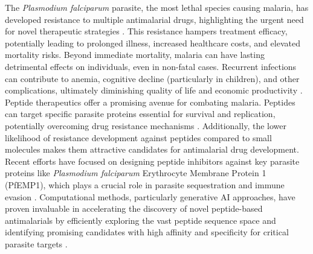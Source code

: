 The \textit{Plasmodium falciparum} parasite, the most lethal species causing malaria, has developed
resistance to multiple antimalarial drugs, highlighting the urgent need for novel therapeutic
strategies \cite{fairhurst2012artemisinin}. This resistance hampers treatment
efficacy, potentially leading to prolonged illness, increased healthcare costs, and elevated
mortality risks. Beyond immediate mortality, malaria can have lasting detrimental effects on
individuals, even in non-fatal cases. Recurrent infections can contribute to anemia, cognitive
decline (particularly in children), and other complications, ultimately diminishing quality of life
and economic productivity \cite{shukla2022super}.
\\

Peptide therapeutics offer a promising avenue for combating malaria. Peptides can target specific
parasite proteins essential for survival and replication, potentially overcoming drug resistance
mechanisms \cite{li2009pfemp1}. Additionally, the lower likelihood of resistance development against
peptides compared to small molecules makes them attractive candidates for antimalarial drug
development. Recent efforts have focused on designing peptide inhibitors against key parasite
proteins like \textit{Plasmodium falciparum} Erythrocyte Membrane Protein 1 (PfEMP1), which plays a
crucial role in parasite sequestration and immune evasion \cite{jensen2020pfemp1}. Computational methods, particularly
generative AI approaches, have proven invaluable in accelerating the discovery of novel
peptide-based antimalarials by efficiently exploring the vast peptide sequence space and identifying
promising candidates with high affinity and specificity for critical parasite targets
\cite{chang2022rational}.
